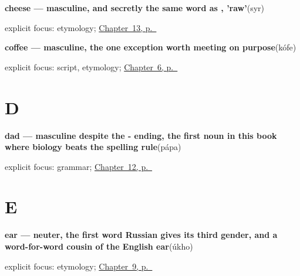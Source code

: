 \noindent\begin{minipage}[t]{\linewidth}
\raggedright
\textbf{cheese — masculine, and secretly the same word as , 'raw'}\enspace\emph{}\enspace(syr)\par
\footnotesize explicit focus: etymology; \hyperref[ch:russian-milk-cheese-juice-soup]{Chapter~13, p.~\pageref*{ch:russian-milk-cheese-juice-soup}}
\end{minipage}\par\smallskip

\noindent\begin{minipage}[t]{\linewidth}
\raggedright
\textbf{coffee — masculine, the one exception worth meeting on purpose}\enspace\emph{}\enspace(kófe)\par
\footnotesize explicit focus: script, etymology; \hyperref[ch:russian-water-coffee-tea-bread]{Chapter~6, p.~\pageref*{ch:russian-water-coffee-tea-bread}}
\end{minipage}\par\smallskip

\section*{D}

\noindent\begin{minipage}[t]{\linewidth}
\raggedright
\textbf{dad — masculine despite the - ending, the first noun in this book where biology beats the spelling rule}\enspace\emph{}\enspace(pápa)\par
\footnotesize explicit focus: grammar; \hyperref[ch:russian-mother-and-father]{Chapter~12, p.~\pageref*{ch:russian-mother-and-father}}
\end{minipage}\par\smallskip

\section*{E}

\noindent\begin{minipage}[t]{\linewidth}
\raggedright
\textbf{ear — neuter, the first word Russian gives its third gender, and a word-for-word cousin of the English ear}\enspace\emph{}\enspace(úkho)\par
\footnotesize explicit focus: etymology; \hyperref[ch:russian-face-parts]{Chapter~9, p.~\pageref*{ch:russian-face-parts}}
\end{minipage}\par\smallskip

